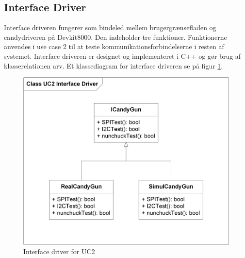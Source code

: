 \subsection{Interface Driver}
Interface driveren fungerer som bindeled mellem brugergrænsefladen og candydriveren på Devkit8000. Den indeholder tre funktioner. Funktionerne anvendes i use case 2 til at teste kommunikationsforbindelserne i resten af systemet. Interface driveren er designet og implementeret i C++ og gør brug af klasserelationen arv. Et klassediagram for interface driveren se på figur  \ref{fig:idriveruc2}.\\

\begin{figure}[H]
	\centering
	\includegraphics[width=\textwidth]{Afsnit/DesignOgImplementering/images/IdriverKlasseDiagram}
	\caption{Interface driver for UC2}
	\label{fig:idriveruc2}
\end{figure}

